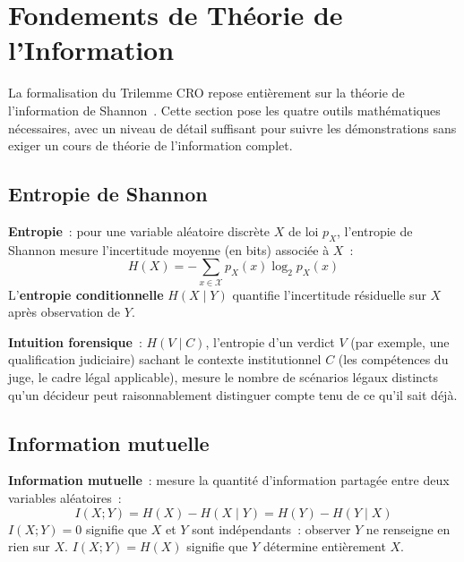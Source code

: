 \section{Fondements de Théorie de l'Information}
\label{sec:fondements-ti}

La formalisation du Trilemme CRO repose entièrement sur la théorie
de l'information de Shannon~\cite{shannon1948}. Cette section pose
les quatre outils mathématiques nécessaires, avec un niveau de
détail suffisant pour suivre les démonstrations sans exiger un
cours de théorie de l'information complet.

\subsection{Entropie de Shannon}

\begin{boxdef}
\textbf{Entropie}~: pour une variable
aléatoire discrète $X$ de loi $p_X$, l'entropie de Shannon mesure
l'incertitude moyenne (en bits) associée à $X$~:
\begin{equation}
H(X) = -\sum_{x \in \mathcal{X}} p_X(x) \log_2 p_X(x)
\label{eq:entropie}
\end{equation}
L'\textbf{entropie conditionnelle} $H(X \mid Y)$ quantifie
l'incertitude résiduelle sur $X$ après observation de $Y$.
\end{boxdef}

\textbf{Intuition forensique}~: $H(V \mid C)$, l'entropie d'un
verdict $V$ (par exemple, une qualification judiciaire) sachant le
contexte institutionnel $C$ (les compétences du juge, le cadre
légal applicable), mesure le nombre de scénarios légaux distincts
qu'un décideur peut raisonnablement distinguer compte tenu de ce
qu'il sait déjà.

\subsection{Information mutuelle}

\begin{boxdef}
\textbf{Information mutuelle}~: mesure la quantité d'information
partagée entre deux variables aléatoires~:
\begin{equation}
I(X;Y) = H(X) - H(X \mid Y) = H(Y) - H(Y \mid X)
\label{eq:info-mutuelle}
\end{equation}
$I(X;Y) = 0$ signifie que $X$ et $Y$ sont indépendants~: observer
$Y$ ne renseigne en rien sur $X$. $I(X;Y) = H(X)$ signifie que $Y$
détermine entièrement $X$.
\end{boxdef}

